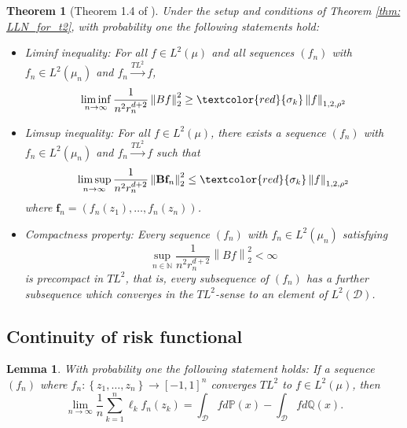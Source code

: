 \documentclass{article}
\newcommand{\norm}[1]{\left\lVert#1\right\rVert}
\newcommand{\set}[1]{\left\{#1\right\}}
\newcommand{\Naturals}{\mathbb{N}}
\newcommand{\Bbf}{\mathbf{B}}
\newcommand{\fbf}{\mathbf{f}}
\newcommand{\Dset}{\mathcal{D}}
\newcommand{\Pbb}{\mathbb{P}}
\newcommand{\Qbb}{\mathbb{Q}}
\newcommand{\1}{\mathbf{1}}
\theoremstyle{alden}
\theoremstyle{aldenthm}
\newtheorem{theorem}{Theorem}
\newtheorem{lemma}{Lemma}
\theoremstyle{remark}
\begin{document}
\begin{theorem}[Theorem 1.4 of \cite{trillos2018}]
	\label{thm: gamma_convergence_energy_functional}
	Under the setup and conditions of Theorem \ref{thm: LLN_for_t2}, with probability one the following statements hold:
	\begin{itemize}
		\item \emph{Liminf inequality:}
		For all $f \in L^2(\mu)$ and all sequences $(f_n)$ with $f_n \in L^2(\mu_n)$ and $f_n \overset{TL^2}{\to} f$,
		\begin{equation*}
		\liminf_{n \to \infty} \frac{1}{n^2 r_n^{d + 2}} \norm{Bf}_2^2 \geq \textcolor{red}{\sigma_{k}} \norm{f}_{1,2,\rho^2}
		\end{equation*}
		
		\item \emph{Limsup inequality:} For all $f \in L^2(\mu)$, there exists a sequence $(f_n)$ with $f_n \in L^2(\mu_n)$ and $f_n \overset{TL^2}{\to} f$ such that
		\begin{equation*}
		\limsup_{n \to \infty} \frac{1}{n^2 r_n^{d + 2}} \norm{\Bbf \fbf_n }_2^2 \leq \textcolor{red}{\sigma_{k}} \norm{f}_{1,2,\rho^2}
		\end{equation*}
		where $\fbf_n = (f_n(z_1), \ldots, f_n(z_n))$.
		
		\item \emph{Compactness property:} Every sequence $(f_n)$ with $f_n \in L^2(\mu_n)$ satisfying
		\begin{equation*}
		\sup_{n \in \Naturals} \frac{1}{n^2 r_n^{d + 2}} \norm{Bf}_2^2 < \infty
		\end{equation*}
		is precompact in $TL^2$, that is, every subsequence of $(f_n)$ has a further subsequence which converges in the $TL^2$-sense to an element of $L^2(\Dset)$.
	\end{itemize}
	
\end{theorem}

\subsection{Continuity of risk functional}



\begin{lemma}
	\label{lem: continuity_of_risk_functional}
	With probability one the following statement holds: If a sequence $(f_n)$ where $f_n: \set{z_1, \ldots,z_n} \to [-1,1]^{n}$ converges $TL^2$ to $f \in L^2(\mu)$, then
	\begin{equation*}
	\lim_{n \to \infty} \frac{1}{n} \sum_{k = 1}^{n} \ell_k f_n(z_k) = \int_{\Dset} f d\Pbb(x) - \int_{\Dset} fd\Qbb(x).
 	\end{equation*}
\end{lemma}
\end{document}
